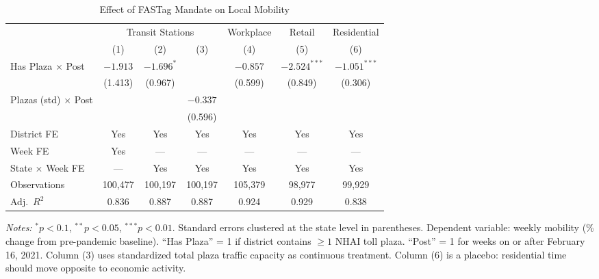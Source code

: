 \begin{table}[t]
\centering
\caption{Effect of FASTag Mandate on Local Mobility}
\label{tab:main_did}
\small
\begin{tabular}{lcccccc}
\toprule
 & \multicolumn{3}{c}{Transit Stations} & Workplace & Retail & Residential \\
\cmidrule(lr){2-4} \cmidrule(lr){5-5} \cmidrule(lr){6-6} \cmidrule(lr){7-7}
 & (1) & (2) & (3) & (4) & (5) & (6) \\
\midrule
Has Plaza $\times$ Post & $-1.913$ & $-1.696^{*}$ & & $-0.857$ & $-2.524^{***}$ & $-1.051^{***}$ \\
 & (1.413) & (0.967) & & (0.599) & (0.849) & (0.306) \\
Plazas (std) $\times$ Post & & & $-0.337$ & & & \\
 & & & (0.596) & & & \\
\addlinespace
District FE & Yes & Yes & Yes & Yes & Yes & Yes \\
Week FE & Yes & --- & --- & --- & --- & --- \\
State $\times$ Week FE & --- & Yes & Yes & Yes & Yes & Yes \\
\addlinespace
Observations & 100,477 & 100,197 & 100,197 & 105,379 & 98,977 & 99,929 \\
Adj.\ $R^2$ & 0.836 & 0.887 & 0.887 & 0.924 & 0.929 & 0.838 \\
\bottomrule
\end{tabular}
\begin{tablenotes}
\item \textit{Notes:} $^{*}p<0.1$, $^{**}p<0.05$, $^{***}p<0.01$. Standard errors clustered at the state level in parentheses. Dependent variable: weekly mobility (\% change from pre-pandemic baseline). ``Has Plaza'' = 1 if district contains $\geq 1$ NHAI toll plaza. ``Post'' = 1 for weeks on or after February 16, 2021. Column (3) uses standardized total plaza traffic capacity as continuous treatment. Column (6) is a placebo: residential time should move opposite to economic activity.
\end{tablenotes}
\end{table}

